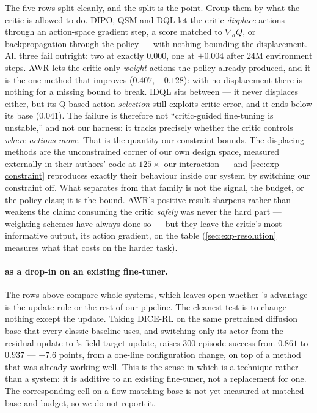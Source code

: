 The five rows split cleanly, and the split is the point. Group them by what
the critic is allowed to do. DIPO, QSM and DQL let the critic \emph{displace}
actions --- through an action-space gradient step, a score matched to
$\nabla_a Q$, or backpropagation through the policy --- with nothing bounding
the displacement. All three fail outright: two at exactly $0.000$, one at
$+0.004$ after $24$M environment steps. AWR lets the critic only
\emph{weight} actions the policy already produced, and it is the one method
that improves ($0.407$, $+0.128$): with no displacement there is nothing for
a missing bound to break. IDQL sits between --- it never displaces either,
but its Q-based action \emph{selection} still exploits critic error, and it
ends below its base ($0.041$). The failure is therefore not ``critic-guided
fine-tuning is unstable,'' and not our harness: it tracks precisely whether
the critic controls \emph{where actions move}. That is the quantity our
constraint bounds. The displacing methods are the unconstrained corner of
our own design space, measured externally in their authors' code at
$125\times$ our interaction --- and \cref{sec:exp-constraint} reproduces
exactly their behaviour inside our system by switching our constraint off.
What separates \method{} from that family is not the signal, the budget, or
the policy class; it is the bound. AWR's positive result sharpens rather
than weakens the claim: consuming the critic \emph{safely} was never the
hard part --- weighting schemes have always done so --- but they leave the
critic's most informative output, its action gradient, on the table
(\cref{sec:exp-resolution} measures what that costs on the harder task).

\paragraph{\method{} as a drop-in on an existing fine-tuner.}
The rows above compare whole systems, which leaves open whether \method{}'s
advantage is the update rule or the rest of our pipeline. The cleanest test
is to change nothing except the update. Taking DICE-RL on the same
pretrained diffusion base that every classic baseline uses, and switching
only its actor from the residual update to \method{}'s field-target update,
raises $300$-episode success from $0.861$ to $0.937$ --- $+7.6$ points, from
a one-line configuration change, on top of a method that was already working
well. This is the sense in which \method{} is a technique rather than a
system: it is additive to an existing fine-tuner, not a replacement for one.
The corresponding cell on a flow-matching base is not yet measured at
matched base and budget, so we do not report it.

